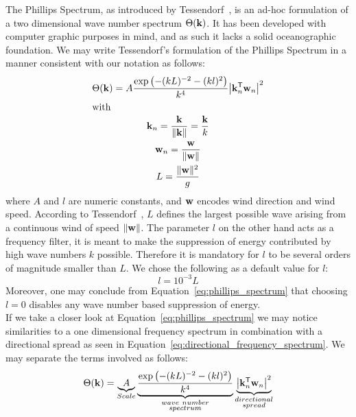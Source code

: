 %
The Phillips Spectrum, as introduced by Tessendorf~\cite{course:simulatingocean}, is an ad-hoc formulation of a two dimensional wave number spectrum $\Theta(\mvec{k})$. It has been developed with computer graphic purposes in mind, and as such it lacks a solid oceanographic foundation. We may write Tessendorf's formulation of the Phillips Spectrum in a manner consistent with our notation as follows:
%
\begin{subequations}
\begin{gather}
\label{eq:phillips_spectrum}
 \Theta(\mvec{k}) = A\frac{\exp\left(-(kL)^{-2}-(kl)^2\right)}{k^4}\abs*{\transpose{\mvec{k}_n}\mvec{w}_n}^2\\
\intertext{with}
\mvec{k}_n = \frac{\mvec{k}}{\norm{\mvec{k}}} = \frac{\mvec{k}}{k}\\
\mvec{w}_n = \frac{\mvec{w}}{\norm{\mvec{w}}}\\
L = \frac{\norm{\mvec{w}}^2}{g}
\end{gather}
\end{subequations}
%
where $A$ and $l$ are numeric constants, and $\mvec{w}$ encodes wind direction and wind speed.
According to Tessendorf~\cite{course:simulatingocean}, $L$ defines the largest possible wave
arising from a continuous wind of speed $\norm{\mvec{w}}$. The parameter $l$ on the other hand
acts as a frequency filter, it is meant to make the suppression of energy contributed by high
wave numbers $k$ possible. Therefore it is mandatory for $l$ to be several orders of magnitude
smaller than $L$. We chose the following as a default value for $l$:
\begin{equation}
 l = 10^{-3}L
\end{equation}
Moreover, one may conclude from Equation~\ref{eq:phillips_spectrum} that choosing $l = 0$ disables
any wave number based suppression of energy.\\

If we take a closer look at Equation~\ref{eq:phillips_spectrum} we may notice similarities to a one dimensional frequency spectrum in combination with a directional spread as seen in Equation~\ref{eq:directional_frequency_spectrum}. We may separate the terms involved as follows:
\begin{equation}
 \Theta(\mvec{k}) = \underbrace{A}_{Scale}\underbrace{\frac{\exp\left(-(kL)^{-2}-(kl)^2\right)}{k^4}}_{\substack{wave~ number\\spectrum}}\underbrace{\abs*{\transpose{\mvec{k}_n}\mvec{w}_n}^2}_{\substack{directional\\spread}}
\end{equation}


